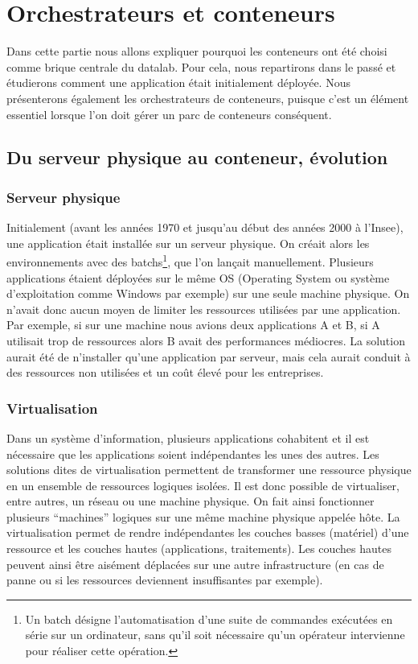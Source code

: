 \documentclass[11pt,fleqn]{book} %
\begin{document}
\chapter{Orchestrateurs et conteneurs}
\vspace{-2cm}

Dans cette partie nous allons expliquer pourquoi les conteneurs ont été choisi comme brique centrale du datalab. Pour cela, nous repartirons dans le passé et étudierons comment une application était initialement déployée. Nous présenterons également les orchestrateurs de conteneurs, puisque c'est un élément essentiel lorsque l'on doit gérer un parc de conteneurs conséquent.

\section{Du serveur physique au conteneur, évolution}
\subsection{Serveur physique}
Initialement (avant les années 1970 et jusqu'au début des années 2000 à l'Insee), une application était installée sur un serveur physique. On créait alors les environnements avec des batchs\footnote{Un batch désigne l'automatisation d'une suite de commandes exécutées en série sur un ordinateur, sans qu'il soit nécessaire qu'un opérateur intervienne pour réaliser cette opération.}, que l'on lançait manuellement. Plusieurs applications étaient déployées sur le même OS (Operating System ou système d'exploitation comme Windows par exemple) sur une seule machine physique. On n'avait donc aucun moyen de limiter les ressources utilisées par une application. Par exemple, si sur une machine nous avions deux applications A et B, si A utilisait trop de ressources alors B avait des performances médiocres. La solution aurait été de n'installer qu'une application par serveur, mais cela aurait conduit à des ressources non utilisées et un coût élevé pour les entreprises. \newline


\newline

\subsection{Virtualisation}
Dans un système d'information, plusieurs applications cohabitent et il est nécessaire que les applications soient indépendantes les unes des autres. Les solutions dites de virtualisation permettent de transformer une ressource physique en un ensemble de ressources logiques isolées. Il est donc possible de virtualiser, entre autres, un réseau ou une machine physique. On fait ainsi fonctionner plusieurs “machines” logiques sur une même machine physique appelée hôte. La virtualisation permet de rendre indépendantes les couches basses (matériel) d’une ressource et les couches hautes (applications, traitements). Les couches hautes peuvent ainsi être aisément déplacées sur une autre infrastructure (en cas de panne ou si les ressources deviennent insuffisantes par exemple).
\end{document}
